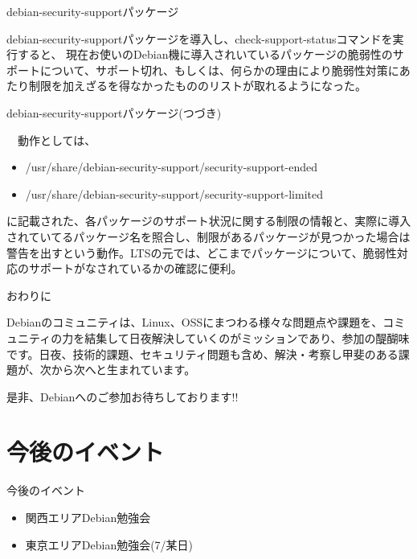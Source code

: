 \begin{frame}{debian-security-supportパッケージ}

 debian-security-supportパッケージを導入し、check-support-statusコマンドを実行すると、
現在お使いのDebian機に導入されいているパッケージの脆弱性のサポートについて、サポート切れ、もしくは、何らかの理由により脆弱性対策にあたり制限を加えざるを得なかったもののリストが取れるようになった。

\end{frame}

\begin{frame}{debian-security-supportパッケージ(つづき)}

  　動作としては、
\begin{itemize}
\item  /usr/share/debian-security-support/security-support-ended
\item /usr/share/debian-security-support/security-support-limited
\end{itemize}
に記載された、各パッケージのサポート状況に関する制限の情報と、実際に導入されていてるパッケージ名を照合し、制限があるパッケージが見つかった場合は警告を出すという動作。LTSの元では、どこまでパッケージについて、脆弱性対応のサポートがなされているかの確認に便利。

\end{frame}

\begin{frame}{おわりに}

  Debianのコミュニティは、Linux、OSSにまつわる様々な問題点や課題を、コミュニティの力を結集して日夜解決していくのがミッションであり、参加の醍醐味です。日夜、技術的課題、セキュリティ問題も含め、解決・考察し甲斐のある課題が、次から次へと生まれています。

\begin{center}
是非、Debianへのご参加お待ちしております!!
\end{center}

\end{frame}

\section{今後のイベント}
\begin{frame}{今後のイベント}
\begin{itemize}
 \item 関西エリアDebian勉強会
 \item 東京エリアDebian勉強会(7/某日)
\end{itemize}
\end{frame}

